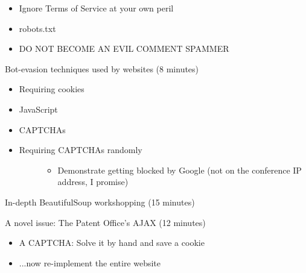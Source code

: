 \documentclass[10pt,a4paper,english]{article}
\begin{document}
\begin{itemize}
\item {} 
Ignore Terms of Service at your own peril

\item {} 
robots.txt

\item {} 
DO NOT BECOME AN EVIL COMMENT SPAMMER

\end{itemize}
\setcounter{listcnt0}{0}
\begin{list}{.}
{
\addtocounter{listcnt0}{16}
\setlength{\rightmargin}{\leftmargin}
}
\item {} 
Bot-evasion techniques used by websites (8 minutes)

\end{list}
\begin{itemize}
\item {} 
Requiring cookies

\item {} 
JavaScript

\item {} 
CAPTCHAs

\item {} \begin{description}
\item[{Requiring CAPTCHAs randomly}] \leavevmode \begin{itemize}
\item {} 
Demonstrate getting blocked by Google (not on the conference IP address, I promise)

\end{itemize}

\end{description}

\end{itemize}
\setcounter{listcnt0}{0}
\begin{list}{.}
{
\addtocounter{listcnt0}{17}
\setlength{\rightmargin}{\leftmargin}
}
\item {} 
In-depth BeautifulSoup workshopping (15 minutes)

\item {} 
A novel issue: The Patent Office's AJAX (12 minutes)

\end{list}
\begin{itemize}
\item {} 
A CAPTCHA: Solve it by hand and save a cookie

\item {} 
...now re-implement the entire website

\end{itemize}
\end{document}

